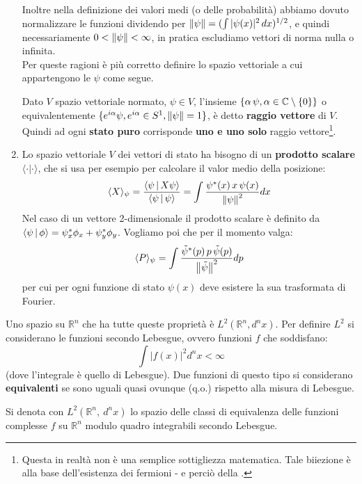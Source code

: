 \documentclass[FisicaTeorica.tex]{subfiles}
\begin{document}
\begin{enumerate}
    Inoltre nella definizione dei valori medi (o delle probabilità) abbiamo dovuto normalizzare le funzioni dividendo per $\left\lVert\psi\right\rVert = (\int |\psi(x)|^2\, dx)^{1/2}$, e quindi necessariamente $0<\left\lVert\psi\right\rVert<\infty$, in pratica escludiamo vettori di norma nulla o infinita.\\
    Per queste ragioni è più corretto definire lo spazio vettoriale a cui appartengono le $\psi$ come segue. \vspace{-0.3em}
    \begin{dfn}
    Dato $V$ spazio vettoriale normato, $\psi \in V$, l'insieme $\{\alpha\,\psi, \alpha \in \mathbb{C}\setminus \{0\}\}$ o equivalentemente $\{e^{i\alpha}\psi, e^{i\alpha} \in S^1, \left\lVert\psi\right\rVert = 1 \}$, è detto \textbf{raggio vettore} di $V$. Quindi ad ogni \textbf{stato puro} corrisponde \textbf{uno e uno solo} raggio vettore\footnote{Questa in realtà non è una semplice sottigliezza matematica. Tale biiezione  è alla base dell'esistenza dei fermioni - e perciò della .}.
    \end{dfn}
    \item Lo spazio vettoriale $V$ dei vettori di stato ha bisogno di un \textbf{prodotto scalare} $\langle \cdot | \cdot \rangle$, che si usa per esempio per calcolare il valor medio della posizione:
    \[
    \langle X\rangle_\psi = \frac{\Braket{\psi|X\psi}}{\Braket{\psi|\psi}} = \int \frac{\psi^*(x) \, x \, \psi(x)}{\left\lVert\psi\right\rVert^2} dx
    \]
    Nel caso di un vettore 2-dimensionale il prodotto scalare è definito da $\Braket{\psi|\phi} = \psi_x^* \phi_x + \psi_y^* \phi_y$.
    Vogliamo poi che per il momento valga:
    \[
    \langle P \rangle_\psi = \int \frac{\tilde\psi^*(p) \, p \, \tilde\psi(p)}{\left\lVert\tilde{\psi}\right\rVert^2} dp
    \]
    per cui per ogni funzione di stato  $\psi(x)$ deve esistere la sua trasformata di Fourier.
\end{enumerate}
Uno spazio su $\mathbb{R}^n$ che ha tutte queste proprietà è $L^2\left(\mathbb{R}^n,d^nx\right)$. Per definire $L^2$ si  considerano le funzioni  secondo Lebesgue, ovvero funzioni $f$ che soddisfano:
\[
	\int \left|f\left(x\right)\right|^2d^nx<\infty
\]
(dove l'integrale è quello di Lebesgue). Due funzioni di questo tipo si considerano \textbf{equivalenti} se sono uguali quasi ovunque (q.o.) rispetto alla misura di Lebesgue.
\begin{dfn}
Si denota con $L^2\left(\mathbb{R}^n,\ d^n x\right)$ lo spazio delle classi di equivalenza delle funzioni complesse $f$ su $\mathbb{R}^n$ modulo quadro integrabili secondo Lebesgue.
\end{dfn}
\end{document}
